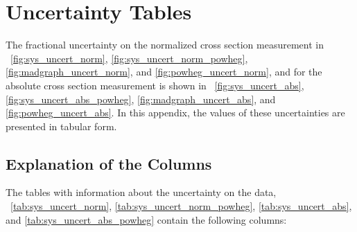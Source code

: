 \chapter{Uncertainty Tables}
\label{app:uncertainty_tables}

The fractional uncertainty on the normalized cross section measurement in
\FIGS~\ref{fig:sys_uncert_norm}, \ref{fig:sys_uncert_norm_powheg},
\ref{fig:madgraph_uncert_norm}, and \ref{fig:powheg_uncert_norm}, and for the
absolute cross section measurement is shown in \FIGS~\ref{fig:sys_uncert_abs},
\ref{fig:sys_uncert_abs_powheg}, \ref{fig:madgraph_uncert_abs}, and
\ref{fig:powheg_uncert_abs}. In this appendix, the values of these
uncertainties are presented in tabular form.

\section{Explanation of the Columns}

The tables with information about the uncertainty on the data,
\TABS~\ref{tab:sys_uncert_norm}, \ref{tab:sys_uncert_norm_powheg},
\ref{tab:sys_uncert_abs}, and \ref{tab:sys_uncert_abs_powheg} contain the
following columns:

